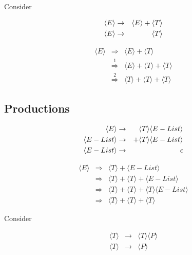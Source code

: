 \documentclass[a4paper,12pt]{article}
\begin{document}
Consider

\begin{eqnarray}
\setcounter{equation}{1}
\langle E \rangle		& \to	& \langle E \rangle + \langle T \rangle \\
\langle E \rangle		& \to	& \langle T \rangle \\
\end{eqnarray}

\begin{eqnarray*}
\langle E \rangle	&	\stackrel{}{\Rightarrow}	&	\langle E \rangle + \langle T \rangle \\
						&	\stackrel{1}{\Rightarrow}	&	\langle E \rangle + \langle T \rangle + \langle T \rangle \\
						&	\stackrel{2}{\Rightarrow}	&	\langle T \rangle + \langle T \rangle + \langle T \rangle 
\end{eqnarray*}

\subsection*{Productions}

\begin{eqnarray}
\setcounter{equation}{1}
\langle E \rangle			& 	\to	& \langle T \rangle \langle E-List \rangle \\
\langle E-List \rangle	&	\to	& + \langle T \rangle \langle E-List \rangle \\
\langle E-List \rangle	&	\to	&	\epsilon 
\end{eqnarray}

\begin{eqnarray*}
\langle E \rangle	&	\Rightarrow	&	\langle T \rangle + \langle E-List \rangle \\
						&	\Rightarrow	&	\langle T \rangle + \langle T \rangle + \langle E-List \rangle \\
						&	\Rightarrow	&	\langle T \rangle + \langle T \rangle + \langle T \rangle \langle E-List \rangle \\ 
						&	\Rightarrow	&	\langle T \rangle + \langle T \rangle + \langle T \rangle 
\end{eqnarray*}

Consider

\begin{eqnarray}
\langle T \rangle	& 	\to	& \langle T \rangle \langle P \rangle \\
\langle T \rangle	&	\to	& \langle P \rangle \\
\end{eqnarray}
\end{document}
